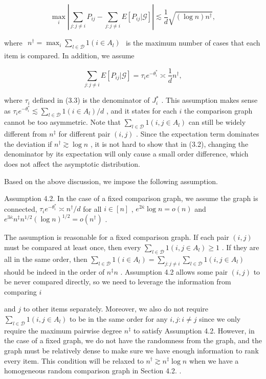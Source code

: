 \[
\max_{i}\left|\sum_{j:j\neq i}P_{ij} - \sum_{j:j\neq i}E[P_{ij}|\mathcal{G}]\right|\lesssim \frac{1}{d}\sqrt{(\log n)n^{\dagger}},
\]

where
\(\begin{array}{r}{n^{\dagger} = \max_{i}\sum_{l\in \mathcal{D}}1(i\in A_{l})} \end{array}\)
is the maximum number of cases that each item is compared. In addition,
we assume

\[
\sum_{j:j\neq i}E[P_{ij}|\mathcal{G}] = \tau_{i}e^{-\theta_{i}^{*}}\asymp \frac{1}{d} n^{\dagger},
\]

where \(\tau_{i}\) defined in (3.3) is the denominator of \(J_{i}^{*}\)
. This assumption makes sense as
\(\tau_{i}e^{- \theta_{i}^{*}}\lesssim \sum_{l\in \mathcal{D}}1(i\in A_{l}) / d\)
, and it states for each \(i\) the comparison graph cannot be too
asymmetric. Note that \(\sum_{l\in \mathcal{D}}1(i,j\in A_{l})\) can
still be widely different from \(n^{\ddagger}\) for different pair
\((i,j)\) . Since the expectation term dominates the deviation if
\(n^{\dagger}\gtrsim \log n\) , it is not hard to show that in (3.2),
changing the denominator by its expectation will only cause a small
order difference, which does not affect the asymptotic distribution.

Based on the above discussion, we impose the following assumption.

Assumption 4.2. In the case of a fixed comparison graph, we assume the
graph is connected,
\(\tau_{i}e^{- \theta_{i}^{*}}\asymp n^{\dagger} / d\) for all
\(i\in [n]\) , \(e^{2\bar{\kappa}}\log n = o(n)\) and
\(e^{3\bar{\kappa}}n^{\ddagger}n^{1 / 2}(\log n)^{1 / 2} = o(n^{\dagger})\)
.

The assumption is reasonable for a fixed comparison graph. If each pair
\((i,j)\) must be compared at least once, then every
\(\sum_{l\in \mathcal{D}}1(i,j\in A_{l})\geq 1\) . If they are all in
the same order, then
\(\sum_{l\in \mathcal{D}}1(i\in A_{l}) = \sum_{j:j\neq i}\sum_{l\in \mathcal{D}}1(i,j\in A_{l})\)
should be indeed in the order of \(n^{\ddagger}n\) . Assumption 4.2
allows some pair \((i,j)\) to be never compared directly, so we need to
leverage the information from comparing \(i\)

and \(j\) to other items separately. Moreover, we also do not require
\(\sum_{l\in \mathcal{D}}1(i,j\in A_l)\) to be in the same order for any
\(i,j:i\neq j\) since we only require the maximum pairwise degree
\(n^{\ddagger}\) to satisfy Assumption 4.2. However, in the case of a
fixed graph, we do not have the randomness from the graph, and the graph
must be relatively dense to make sure we have enough information to rank
every item. This condition will be relaxed to
\(n^{\dagger}\gtrsim n^{\ddagger}\log n\) when we have a homogeneous
random comparison graph in Section 4.2. .

